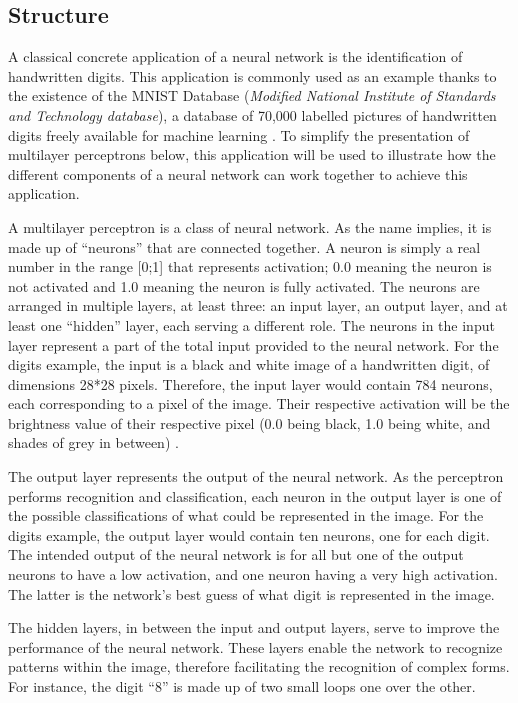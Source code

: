 ﻿\documentclass[12pt,a4paper,notitlepage]{article}
\begin{document}
\subsection{Structure}
A classical concrete application of a neural network is the identification of handwritten digits. This application is commonly used as an example thanks to the existence of the MNIST Database (\textit{Modified National Institute of Standards and Technology database}), a database of 70,000 labelled pictures of handwritten digits freely available for machine learning \cite{lecun_mnist_1998}. To simplify the presentation of multilayer perceptrons below, this application will be used to illustrate how the different components of a neural network can work together to achieve this application.

A multilayer perceptron is a class of neural network. As the name implies, it is made up of “neurons” that are connected together. A neuron is simply a real number in the range [0;1] that represents activation; 0.0 meaning the neuron is not activated and 1.0 meaning the neuron is fully activated. The neurons are arranged in multiple layers, at least three: an input layer, an output layer, and at least one “hidden” layer, each serving a different role.
The neurons in the input layer represent a part of the total input provided to the neural network. For the digits example, the input is a black and white image of a handwritten digit, of dimensions 28*28 pixels. Therefore, the input layer would contain 784 neurons, each corresponding to a pixel of the image. Their respective activation will be the brightness value of their respective pixel (0.0 being black, 1.0 being white, and shades of grey in between) \cite{sanderson_but_2017}.

The output layer represents the output of the neural network. As the perceptron performs recognition and classification, each neuron in the output layer is one of the possible classifications of what could be represented in the image. For the digits example, the output layer would contain ten neurons, one for each digit. The intended output of the neural network is for all but one of the output neurons to have a low activation, and one neuron having a very high activation. The latter is the network's best guess of what digit is represented in the image.

The hidden layers, in between the input and output layers, serve to improve the performance of the neural network. These layers enable the network to recognize patterns within the image, therefore facilitating the recognition of complex forms. For instance, the digit “8” is made up of two small loops one over the other. 
\end{document}
